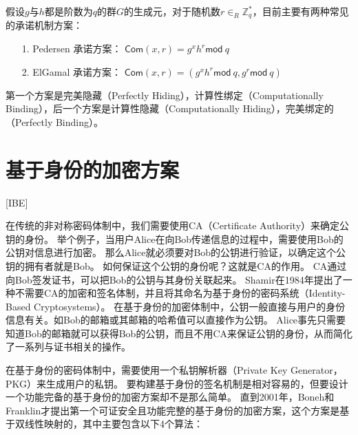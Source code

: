 假设$g$与$h$都是阶数为$q$的群$G$的生成元，对于随机数$r\in_R\mathbb{Z}_q^*$，目前主要有两种常见的承诺机制方案：

\begin{itemize}
  \item[1.] Pedersen 承诺方案： $\mathsf{Com}(x,r)=g^xh^r\mathsf{mod}\ q$
  \item[2.] ElGamal 承诺方案： $\mathsf{Com}(x,r)=(g^xh^r \mathsf{mod}\ q,g^r\mathsf{mod}\ q)$
\end{itemize}

第一个方案是完美隐藏（Perfectly Hiding），计算性绑定（Computationally Binding），后一个方案是计算性隐藏（Computationally Hiding），完美绑定的（Perfectly Binding）。

\section{基于身份的加密方案}[IBE]

在传统的非对称密码体制中，我们需要使用CA（Certificate Authority）来确定公钥的身份。
举个例子，当用户Alice在向Bob传递信息的过程中，需要使用Bob的公钥对信息进行加密。
那么Alice就必须要对Bob的公钥进行验证，以确定这个公钥的拥有者就是Bob。
如何保证这个公钥的身份呢？这就是CA的作用。
CA通过向Bob签发证书，可以把Bob的公钥与其身份关联起来。
Shamir在1984年提出了一种不需要CA的加密和签名体制\cite{shamir1984identity}，并且将其命名为基于身份的密码系统（Identity-Based Cryptosystems）。
在基于身份的加密体制中，公钥一般直接与用户的身份信息有关。如Bob的邮箱或其邮箱的哈希值可以直接作为公钥。
Alice事先只需要知道Bob的邮箱就可以获得Bob的公钥，而且不用CA来保证公钥的身份，从而简化了一系列与证书相关的操作。

在基于身份的密码体制中，需要使用一个私钥解析器（Private Key Generator，PKG）来生成用户的私钥。
要构建基于身份的签名机制是相对容易的，但要设计一个功能完备的基于身份的加密方案却不是那么简单。
直到2001年，Boneh和Franklin才提出第一个可证安全且功能完整的基于身份的加密方案\cite{boneh2001identity}，这个方案是基于双线性映射的，其中主要包含以下4个算法：

